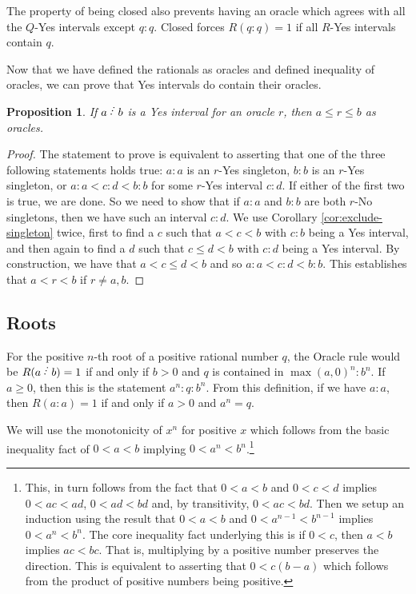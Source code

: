 \documentclass[12pt]{article}
\newtheorem{proposition}{Proposition}[subsection]
\begin{document}
The property of being closed also prevents having an oracle which agrees with all the $Q$-Yes intervals except $q:q$. Closed forces $R(q:q)=1$ if all $R$-Yes intervals contain $q$.

Now that we have defined the rationals as oracles and defined inequality of oracles, we can prove that Yes intervals do contain their oracles.

\begin{proposition}\label{pr:yes-trap}
    If $a\lte b$ is a Yes interval for an oracle $r$, then $a \leq r \leq b$ as oracles.
\end{proposition}

\begin{proof}
    The statement to prove is equivalent to asserting that one of the three following statements holds true: $a:a$ is an $r$-Yes singleton,  $b:b$ is an $r$-Yes singleton, or $a:a < c:d < b:b$ for some $r$-Yes interval $c:d$.  If either of the first two is true, we are done. So we need to show that if $a:a$ and $b:b$ are both $r$-No singletons, then we have such an interval $c:d$. We use Corollary \ref{cor:exclude-singleton} twice, first to find a $c$ such that $a < c < b$ with $c:b$ being a Yes interval, and then again to find a $d$ such that $c \leq d < b$ with $c:d$ being a Yes interval. By construction, we have that $a < c \leq d < b$ and so $a:a < c:d < b:b$. This establishes that $a < r < b$ if $r \neq a, b$.  
\end{proof}


\subsection{Roots}\label{sec:roots}

For the positive $n$-th root of a positive rational number $q$, the Oracle rule would be $R(a\lte b) = 1$ if and only if $b> 0$ and $q$ is contained in $\max(a,0)^n:b^n$. If $a\geq 0$, then this is the statement $a^n:q:b^n$. From this definition, if we have $a:a$, then $R(a:a) = 1$ if and only if $a>0$ and $a^n = q$.

We will use the monotonicity of $x^n$ for positive $x$ which follows from the basic inequality fact of $ 0 < a < b$ implying $0 < a^n < b^n$.\footnote{This, in turn follows from the fact that $0<a<b$ and $0<c<d$ implies $0<ac<ad$, $0<ad<bd$ and, by transitivity, $0<ac<bd$. Then we setup an induction using the result that $0 < a<b$ and $0 < a^{n-1} < b^{n-1}$ implies $0 < a^n < b^n$. The core inequality fact underlying this is if $0<c$, then $a<b$ implies $ac < bc$. That is, multiplying by a positive number preserves the direction. This is equivalent to asserting that $0 < c (b-a)$ which follows from the product of positive numbers being positive.}
\end{document}
